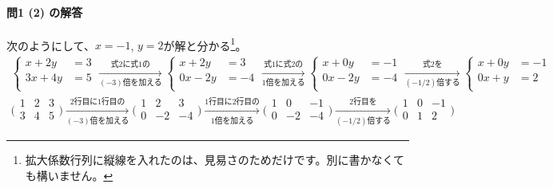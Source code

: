 \paragraph{問1 (2) の解答} 次のようにして、$x = -1$, $y = 2$が解と分かる\footnote{拡大係数行列に縦線を入れたのは、見易さのためだけです。別に書かなくても構いません。}。 %
\begin{align*}
\begin{cases}
x + 2y &= 3 \\
3x + 4y &= 5 \\
\end{cases} \xrightarrow[\text{$(-3)$倍を加える}]{\text{式2に式1の}}
\begin{cases}
x + 2y &= 3 \\
0x - 2y &= -4 \\
\end{cases} \xrightarrow[\text{$1$倍を加える}]{\text{式1に式2の}}
\begin{cases}
x + 0y &= -1 \\
0x - 2y &= -4 \\
\end{cases} \xrightarrow[\text{$(-1/2)$倍する}]{\text{式2を}}
\begin{cases}
x + 0y &= -1 \\
0x + y &= 2 \\
\end{cases}
\\
\biggl(
\begin{array}{rr|r}
1 & 2 & 3 \\
3 & 4 & 5 \\
\end{array}
\biggr) \xrightarrow[\text{$(-3)$倍を加える}]{\text{$2$行目に$1$行目の}}
\biggl(
\begin{array}{rr|r}
1 & 2 & 3 \\
0 & -2 & -4 \\
\end{array}
\biggr)  \xrightarrow[\text{$1$倍を加える}]{\text{$1$行目に$2$行目の}}
\biggl(
\begin{array}{rr|r}
1 & 0 & -1 \\
0 & -2 & -4 \\
\end{array}
\biggr) \xrightarrow[\text{$(-1/2)$倍する}]{\text{$2$行目を}}
\biggl(
\begin{array}{rr|r}
1 & 0 & -1 \\
0 & 1 & 2 \\
\end{array}
\biggr)
\end{align*}


